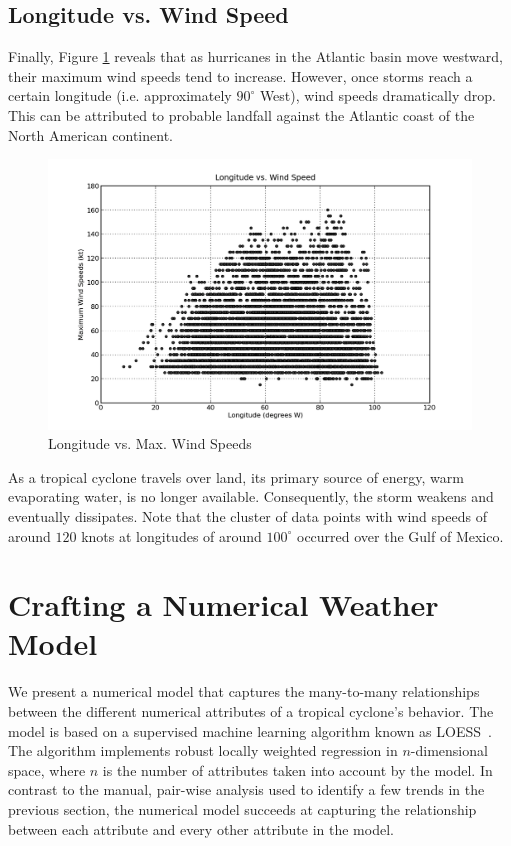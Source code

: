 \documentclass[letterpaper,twocolumn,10pt]{article}
\begin{document}
\subsection{Longitude vs. Wind Speed}
Finally, Figure \ref{longitude_vs_speed} reveals that as hurricanes in the
Atlantic basin move westward, their maximum wind speeds tend to increase.
However, once storms reach a certain longitude (i.e. approximately $90^\circ$
West), wind speeds dramatically drop. This can be attributed to probable
landfall against the Atlantic coast of the North American continent.
\begin{figure}[h!]
  \centering
  \includegraphics[scale=0.31]{longitude_vs_speed.png}
  \caption{Longitude vs. Max. Wind Speeds}
  \label{longitude_vs_speed}
\end{figure}

As a tropical cyclone travels over land, its primary source of energy, warm
evaporating water, is no longer available. Consequently, the storm weakens and
eventually dissipates. Note that the cluster of data points with wind speeds of
around $120$ knots at longitudes of around $100^\circ$ occurred over the Gulf of
Mexico.

\section{Crafting a Numerical Weather Model}

We present a numerical model that captures the many-to-many relationships
between the different numerical attributes of a tropical cyclone's behavior. The
model is based on a supervised machine learning algorithm known as
LOESS~\cite{LOESS}. The algorithm implements robust locally weighted regression
in $n$-dimensional space, where $n$ is the number of attributes taken into
account by the model. In contrast to the manual, pair-wise analysis used to
identify a few trends in the previous section, the numerical model succeeds at
capturing the relationship between each attribute and every other attribute in
the model.
\end{document}
